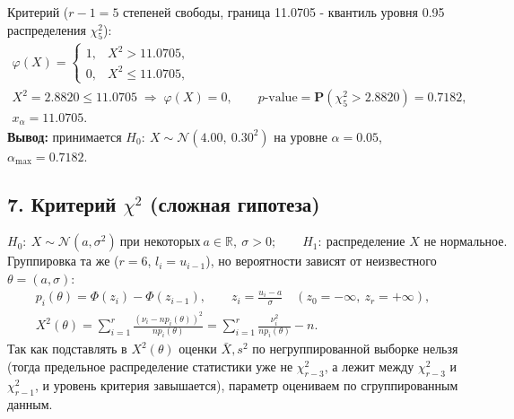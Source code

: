 \documentclass[12pt]{spbstu-task}
\renewcommand{\Prob}{\mathbf{P}}
\begin{document}
Критерий (\(r - 1 = 5\) степеней свободы, граница 11.0705 - квантиль уровня 0.95 распределения \(\chi^2_5\)):
\begin{gather*}
  \varphi(X) =
  \begin{cases}
    1, & X^2 > 11.0705,\\
    0, & X^2 \le 11.0705,
  \end{cases}\\
  X^2 = 2.8820 \le 11.0705 \;\Rightarrow\; \varphi(X) = 0,\qquad
  p\text{-value} = \Prob\left(\chi^2_5 > 2.8820\right) = 0.7182,\\
  x_\alpha = 11.0705.
\end{gather*}
\noindent\textbf{Вывод:} принимается \(H_0:\ X \sim \mathcal{N}(4.00,\ 0.30^2)\) на уровне \(\alpha = 0.05\), \(\alpha_{\max} = 0.7182\).

\subsection*{7. Критерий \(\chi^2\) (сложная гипотеза)}
\begin{displaymath}
  H_0:\ X \sim \mathcal{N}(a, \sigma^2)\ \text{при некоторых}\ a \in \mathbb{R},\ \sigma > 0;\qquad
  H_1:\ \text{распределение } X \text{ не нормальное}.
\end{displaymath}
Группировка та же (\(r = 6\), \(l_i = u_{i-1}\)), но вероятности зависят от неизвестного \(\theta = (a, \sigma)\):
\begin{gather*}
  p_i(\theta) = \Phi(z_i) - \Phi(z_{i-1}),\qquad z_i = \frac{u_i - a}{\sigma}\quad(z_0 = -\infty,\ z_r = +\infty),\\
  X^2(\theta) = \sum_{i=1}^{r}\frac{\left(\nu_i - np_i(\theta)\right)^2}{np_i(\theta)}
  = \sum_{i=1}^{r}\frac{\nu_i^2}{np_i(\theta)} - n.
\end{gather*}
Так как подставлять в \(X^2(\theta)\) оценки \(\bar{X}, s^2\) по негруппированной выборке нельзя
(тогда предельное распределение статистики уже не \(\chi^2_{r - 3}\), а лежит между \(\chi^2_{r - 3}\) и
\(\chi^2_{r - 1}\), и уровень критерия завышается), параметр оцениваем по сгруппированным данным.
\end{document}
